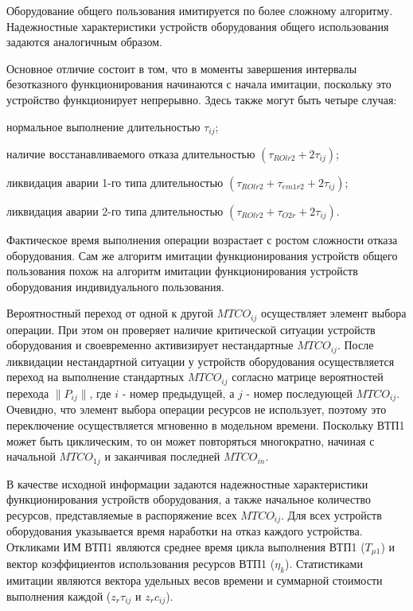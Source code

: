 Оборудование общего пользования имитируется по более сложному алгоритму. Надежностные характеристики устройств оборудования общего использования задаются аналогичным образом.

Основное отличие состоит в том, что в моменты завершения интервалы безотказного функционирования начинаются с начала имитации, поскольку это устройство функционирует непрерывно. Здесь также могут быть четыре случая:
\begin{textitemize}
    \item нормальное выполнение длительностью $\tau_{ij}$;
    \item наличие восстанавливаемого отказа длительностью  $(\tau_{ROlr2} + 2 \tau_{ij})$;
    \item ликвидация аварии 1-го типа длительностью  $(\tau_{ROlr2} + \tau_{em1r2} + 2 \tau_{ij})$;
    \item ликвидация аварии 2-го типа длительностью $(\tau_{ROlr2} + \tau_{O2r} + 2 \tau_{ij})$.
\end{textitemize}


Фактическое время выполнения операции возрастает с ростом сложности отказа оборудования. Сам же алгоритм имитации функционирования устройств общего пользования похож на алгоритм имитации функционирования устройств оборудования индивидуального пользования.




Вероятностный переход от одной к другой $MTCO_{ij}$ осуществляет элемент выбора операции. При этом он проверяет наличие критической ситуации устройств оборудования и своевременно активизирует нестандартные $MTCO_{ij}$.  После ликвидации нестандартной ситуации у устройств оборудования осуществляется переход на выполнение стандартных $MTCO_{ij}$ согласно матрице вероятностей перехода $\parallel P_{ij} \parallel $, где $i$ - номер предыдущей, а $j$ - номер последующей $MTCO_{ij}$.  Очевидно, что элемент выбора операции ресурсов не использует, поэтому это переключение осуществляется мгновенно в модельном времени.  Поскольку ВТП1 может быть циклическим, то он может повторяться многократно, начиная с начальной $MTCO_{1j}$ и заканчивая последней $MTCO_{in}$.

В качестве исходной информации задаются надежностные характеристики функционирования устройств оборудования, а также начальное количество ресурсов, представляемые в распоряжение всех $MTCO_{ij}$. Для всех устройств оборудования указывается время наработки на отказ каждого устройства. Откликами ИМ ВТП1 являются среднее время цикла выполнения ВТП1 ($T_{\mu 1}$) и вектор коэффициентов использования ресурсов ВТП1 ($\eta_{k}$). Статистиками имитации являются вектора удельных весов времени и суммарной стоимости выполнения каждой   ({$z_r \tau_{ij}$} и {$z_rc_{ij}$}).


